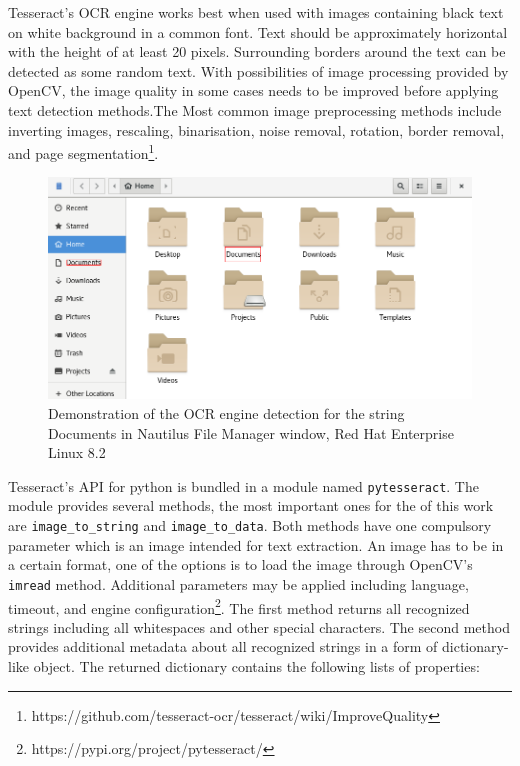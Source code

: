 Tesseract's OCR engine works best when used with images containing black text on white background in a common font. Text should be approximately horizontal with the height of at least 20 pixels. Surrounding borders around the text can be detected as some random text. With possibilities of image processing provided by OpenCV, the image quality in some cases needs to be improved before applying text detection methods.The  Most common image preprocessing methods include inverting images, rescaling, binarisation, noise removal, rotation, border removal, and page segmentation\footnote{https://github.com/tesseract-ocr/tesseract/wiki/ImproveQuality}.
\begin{figure}[hbt]
	\centering
	\includegraphics[width=1\textwidth]{obrazky-figures/ocr+nautilus.png}
	\caption{Demonstration of the OCR engine detection for the string Documents in Nautilus File Manager window, Red Hat Enterprise Linux 8.2}
	\label{ocr_nautilus}
\end{figure}
\bigskip

Tesseract's API for python is bundled in a module named \texttt{pytesseract}. The module provides several methods, the most important ones for the of this work are \verb|image_to_string| and \verb|image_to_data|. Both methods have one compulsory parameter which is an image intended for text extraction. An image has to be in a certain format, one of the options is to load the image through OpenCV's \texttt{imread} method. Additional parameters may be applied including language, timeout, and engine configuration\footnote{https://pypi.org/project/pytesseract/}. The first method returns all recognized strings including all whitespaces and other special characters. The second method provides additional metadata about all recognized strings in a form of dictionary-like object. The returned dictionary contains the following lists of properties:

